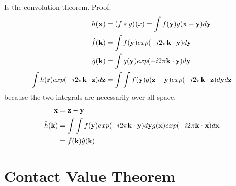 Is the convolution theorem.  Proof:
\begin{align}
h(\textbf{x}) &= (f\ast g)(x) = \int f(\textbf{y})g(\textbf{x}-\textbf{y})d\textbf{y} \\
\hat{f}(\textbf{k}) &= \int f(\textbf{y}) exp(-i2\pi \textbf{k} \cdot \textbf{y})d\textbf{y} \\
\hat{g}(\textbf{k}) &= \int g(\textbf{y}) exp(-i2\pi \textbf{k} \cdot \textbf{y})d\textbf{y} \\
\int h(\textbf{r}) exp(-i2\pi \textbf{k} \cdot \textbf{z}) d\textbf{z} &= \int \int f(\textbf{y}) g(\textbf{z}-\textbf{y}) exp(-i2\pi \textbf{k} \cdot \textbf{z}) d\textbf{y} d\textbf{z}
\end{align}
because the two integrals are necessarily over all space,
\begin{align}
\textbf{x} &= \textbf{z} - \textbf{y} \\
\hat{h}(\textbf{k}) &= \int \int f(\textbf{y}) exp(-i2\pi \textbf{k} \cdot \textbf{y} ) d\textbf{y} g(\textbf{x}) exp(-i2\pi \textbf{k} \cdot \textbf{x}) d\textbf{x} \\
&= \hat{f}(\textbf{k}) \hat{g}(\textbf{k})
\end{align}


\section{Contact Value Theorem}

